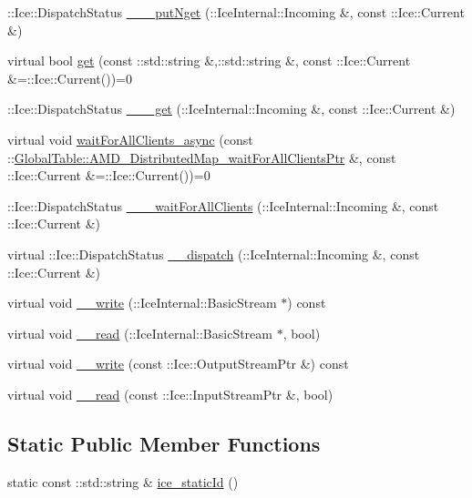 \begin{DoxyCompactItemize}
\item 
::Ice::DispatchStatus \hyperlink{class_global_table_1_1_distributed_map_af93cc87ef0ac309db7d414c033db31e6}{\_\-\_\-\_\-putNget} (::IceInternal::Incoming \&, const ::Ice::Current \&)
\item 
virtual bool \hyperlink{class_global_table_1_1_distributed_map_a5a434538e73a409df08c2c37829b77ef}{get} (const ::std::string \&,::std::string \&, const ::Ice::Current \&=::Ice::Current())=0
\item 
::Ice::DispatchStatus \hyperlink{class_global_table_1_1_distributed_map_a5a40a86ee15c5e514ad11d40f9d2d933}{\_\-\_\-\_\-get} (::IceInternal::Incoming \&, const ::Ice::Current \&)
\item 
virtual void \hyperlink{class_global_table_1_1_distributed_map_a776b9313fa65f6d2c32b8820247045c2}{waitForAllClients\_\-async} (const ::\hyperlink{namespace_global_table_af3e96d293fa3f6f274f78b841b3c3097}{GlobalTable::AMD\_\-DistributedMap\_\-waitForAllClientsPtr} \&, const ::Ice::Current \&=::Ice::Current())=0
\item 
::Ice::DispatchStatus \hyperlink{class_global_table_1_1_distributed_map_addf6be4bfe092e27935eba59a1b61dcb}{\_\-\_\-\_\-waitForAllClients} (::IceInternal::Incoming \&, const ::Ice::Current \&)
\item 
virtual ::Ice::DispatchStatus \hyperlink{class_global_table_1_1_distributed_map_a759c073848cc37b788357c0ce5115119}{\_\-\_\-dispatch} (::IceInternal::Incoming \&, const ::Ice::Current \&)
\item 
virtual void \hyperlink{class_global_table_1_1_distributed_map_a9965a47daa0af75e64fd2f1428f94d5a}{\_\-\_\-write} (::IceInternal::BasicStream $\ast$) const 
\item 
virtual void \hyperlink{class_global_table_1_1_distributed_map_a077b9be47f7dd5a4b4e2ff72ece9b7bc}{\_\-\_\-read} (::IceInternal::BasicStream $\ast$, bool)
\item 
virtual void \hyperlink{class_global_table_1_1_distributed_map_a862fa3febeee2772f21a144f35d97fd5}{\_\-\_\-write} (const ::Ice::OutputStreamPtr \&) const 
\item 
virtual void \hyperlink{class_global_table_1_1_distributed_map_aad7fc00a443c0ded6693678f41683892}{\_\-\_\-read} (const ::Ice::InputStreamPtr \&, bool)
\end{DoxyCompactItemize}
\subsection*{Static Public Member Functions}
\begin{DoxyCompactItemize}
\item 
static const ::std::string \& \hyperlink{class_global_table_1_1_distributed_map_a8c59ff096e7f3257afbaa41c3d6e6905}{ice\_\-staticId} ()
\end{DoxyCompactItemize}


